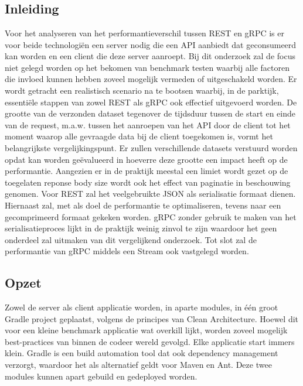 
\chapter{}%
\label{ch:methodologie}

\section{Inleiding}

Voor het analyseren van het performantieverschil tussen REST en gRPC is er voor beide technologi\"en een server nodig die een API aanbiedt dat geconsumeerd kan worden en
een client die deze server aanroept. Bij dit onderzoek zal de focus niet gelegd worden op het bekomen van benchmark testen waarbij alle factoren die invloed kunnen hebben
zoveel mogelijk vermeden of uitgeschakeld worden. Er wordt getracht een realistisch scenario na te bootsen waarbij, in de parktijk, essenti\"ele stappen van zowel REST als gRPC
ook effectief uitgevoerd worden.
De grootte van de verzonden dataset tegenover de tijdsduur tussen de start en einde van de request, m.a.w. tussen het aanroepen van het API door de client
tot het moment waarop alle gevraagde data bij de client toegekomen is, vormt het belangrijkste vergelijkingspunt.
Er zullen verschillende datasets verstuurd worden opdat kan worden ge\"evalueerd in hoeverre deze grootte een impact heeft op de performantie.
Aangezien er in de praktijk meestal een limiet wordt gezet op de toegelaten reponse body size wordt ook het effect van paginatie in beschouwing genomen.
Voor REST zal het veelgebruikte JSON als serialisatie formaat dienen. Hiernaast zal, met als doel de performantie te optimaliseren,
tevens naar een gecomprimeerd formaat gekeken worden. gRPC zonder gebruik te maken van het serialisatieproces lijkt in de praktijk weinig zinvol te zijn waardoor het geen onderdeel
zal uitmaken van dit vergelijkend onderzoek. Tot slot zal de performantie van gRPC middels een Stream ook vastgelegd worden.\\

\section{Opzet}
\label{sec:opzet}

Zowel de server als client applicatie worden, in aparte modules, in \'e\'en groot Gradle project geplaatst, volgens de principes van Clean Architecture. Hoewel dit
voor een kleine benchmark applicatie wat overkill lijkt, worden zoveel mogelijk best-practices van binnen de codeer wereld gevolgd. Elke applicatie start immers klein.
Gradle is een build automation tool dat ook dependency management verzorgt, waardoor het als alternatief geldt voor Maven en Ant. %
Deze twee modules kunnen apart gebuild en gedeployed worden.\newline
~\autocite{Gradle}\\

